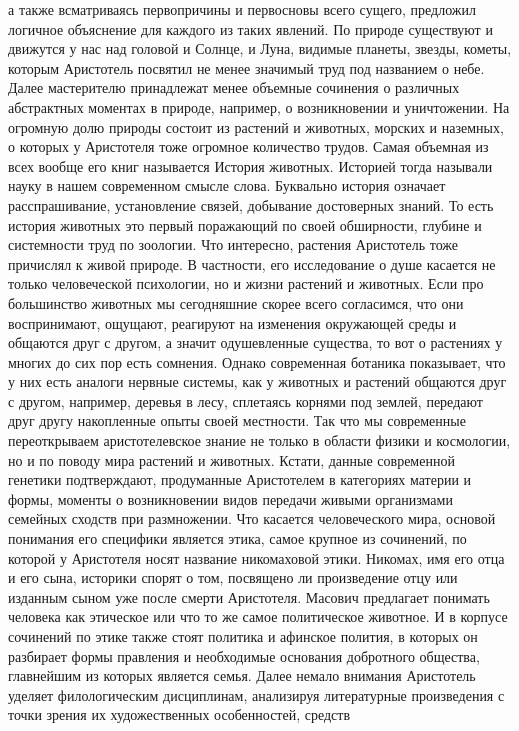 а также всматриваясь первопричины и первосновы всего сущего, предложил логичное
объяснение для каждого из таких явлений. По природе существуют и движутся у нас
над головой и Солнце, и Луна, видимые планеты, звезды, кометы, которым
Аристотель посвятил не менее значимый труд под названием о небе. Далее
мастерителю принадлежат менее объемные сочинения о различных абстрактных
моментах в природе, например, о возникновении и уничтожении. На огромную долю
природы состоит из растений и животных, морских и наземных, о которых у
Аристотеля тоже огромное количество трудов. Самая объемная из всех вообще его
книг называется История животных. Историей тогда называли науку в нашем
современном смысле слова. Буквально история означает расспрашивание,
установление связей, добывание достоверных знаний. То есть история животных это
первый поражающий по своей обширности, глубине и системности труд по зоологии.
Что интересно, растения Аристотель тоже причислял к живой природе. В частности,
его исследование о душе касается не только человеческой психологии, но и жизни
растений и животных. Если про большинство животных мы сегодняшние скорее всего
согласимся, что они воспринимают, ощущают, реагируют на изменения окружающей
среды и общаются друг с другом, а значит одушевленные существа, то вот о
растениях у многих до сих пор есть сомнения. Однако современная ботаника
показывает, что у них есть аналоги нервные системы, как у животных и растений
общаются друг с другом, например, деревья в лесу, сплетаясь корнями под землей,
передают друг другу накопленные опыты своей местности. Так что мы современные
переоткрываем аристотелевское знание не только в области физики и космологии, но
и по поводу мира растений и животных. Кстати, данные современной генетики
подтверждают, продуманные Аристотелем в категориях материи и формы, моменты о
возникновении видов передачи живыми организмами семейных сходств при
размножении. Что касается человеческого мира, основой понимания его специфики
является этика, самое крупное из сочинений, по которой у Аристотеля носят
название никомаховой этики. Никомах, имя его отца и его сына, историки спорят о
том, посвящено ли произведение отцу или изданным сыном уже после смерти
Аристотеля. Масович предлагает понимать человека как этическое или что то же
самое политическое животное. И в корпусе сочинений по этике также стоят политика
и афинское полития, в которых он разбирает формы правления и необходимые
основания добротного общества, главнейшим из которых является семья. Далее
немало внимания Аристотель уделяет филологическим дисциплинам, анализируя
литературные произведения с точки зрения их художественных особенностей, средств
